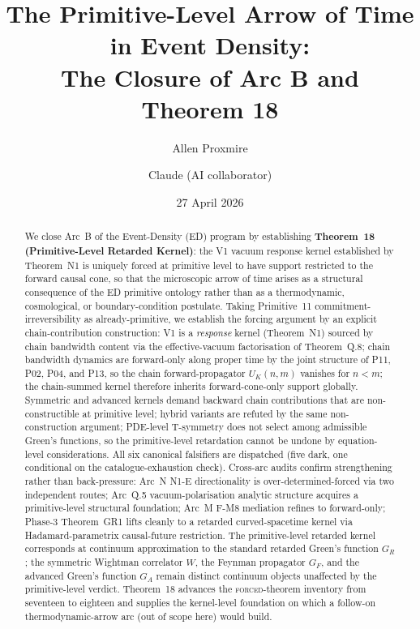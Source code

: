 \documentclass[11pt,a4paper]{article}
\title{The Primitive-Level Arrow of Time in Event Density:\\ The Closure of Arc B and Theorem 18}
\author{Allen Proxmire \and Claude (AI collaborator)}
\date{27 April 2026}
\begin{document}
\maketitle

\begin{abstract}
We close Arc~B of the Event-Density (ED) program by establishing \textbf{Theorem~18 (Primitive-Level Retarded Kernel)}: the V1 vacuum response kernel established by Theorem~N1 is uniquely forced at primitive level to have support restricted to the forward causal cone, so that the microscopic arrow of time arises as a structural consequence of the ED primitive ontology rather than as a thermodynamic, cosmological, or boundary-condition postulate. Taking Primitive~11 commitment-irreversibility as already-primitive, we establish the forcing argument by an explicit chain-contribution construction: V1 is a \emph{response} kernel (Theorem~N1) sourced by chain bandwidth content via the effective-vacuum factorisation of Theorem~Q.8; chain bandwidth dynamics are forward-only along proper time by the joint structure of P11, P02, P04, and P13, so the chain forward-propagator $U_K(n,m)$ vanishes for $n<m$; the chain-summed kernel therefore inherits forward-cone-only support globally. Symmetric and advanced kernels demand backward chain contributions that are non-constructible at primitive level; hybrid variants are refuted by the same non-construction argument; PDE-level T-symmetry does not select among admissible Green's functions, so the primitive-level retardation cannot be undone by equation-level considerations. All six canonical falsifiers are dispatched (five dark, one conditional on the catalogue-exhaustion check). Cross-arc audits confirm strengthening rather than back-pressure: Arc~N N1-E directionality is over-determined-forced via two independent routes; Arc~Q.5 vacuum-polarisation analytic structure acquires a primitive-level structural foundation; Arc~M F-M8 mediation refines to forward-only; Phase-3 Theorem~GR1 lifts cleanly to a retarded curved-spacetime kernel via Hadamard-parametrix causal-future restriction. The primitive-level retarded kernel corresponds at continuum approximation to the standard retarded Green's function $G_R$; the symmetric Wightman correlator $W$, the Feynman propagator $G_F$, and the advanced Green's function $G_A$ remain distinct continuum objects unaffected by the primitive-level verdict. Theorem~18 advances the \textsc{forced}-theorem inventory from seventeen to eighteen and supplies the kernel-level foundation on which a follow-on thermodynamic-arrow arc (out of scope here) would build.
\end{abstract}
\end{document}
